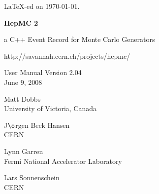 \documentclass[11pt,letterpaper]{article}
\begin{document}
\newenvironment{fminipage}%
{\begin{Sbox}\begin{minipage}}%
{\end{minipage}\end{Sbox}\fbox{\TheSbox}}
%
%
%
\begin{titlepage}
{\tiny \LaTeX-ed on \today.}

\vspace{2cm}

\begin{center}

{\Huge\bf HepMC 2}

\vspace{1cm}

{\huge a C++ Event Record for Monte Carlo Generators }

\vspace{2cm}

{http://savannah.cern.ch/projects/hepmc/}

\vspace{1cm}

{\Large User Manual Version 2.04} \\
June 9, 2008

\vspace{2cm}

{\huge Matt Dobbs} \\
University of Victoria, Canada

\vspace{.2cm}

{\Large J$\o$rgen Beck Hansen} \\
CERN

\vspace{.2cm}

{\Large Lynn Garren} \\
Fermi National Accelerator Laboratory

\vspace{.2cm}

{\Large Lars Sonnenschein} \\
CERN

\vspace{1cm}


\end{center}
\end{titlepage}
\end{document}
